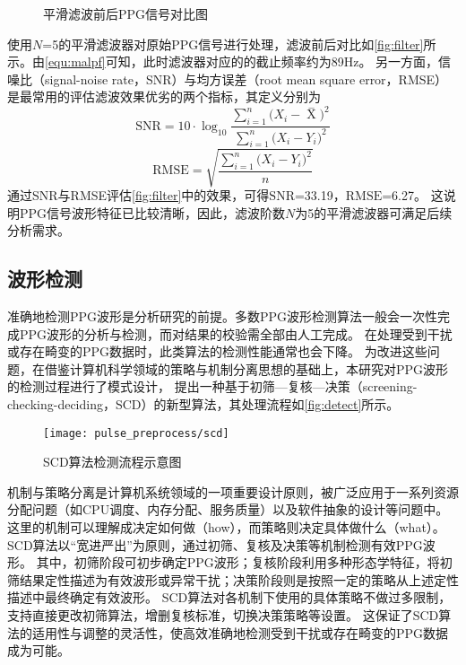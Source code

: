 \begin{figure}[htbp]
    \centering
    \quad
    \caption{\label{fig:filter}平滑滤波前后PPG信号对比图}
\end{figure}

使用$N$=5的平滑滤波器对原始PPG信号进行处理，滤波前后对比如\autoref{fig:filter}所示。由\autoref{equ:malpf}可知，此时滤波器对应的的截止频率约为89Hz。
另一方面，信噪比（signal-noise rate，SNR）与均方误差（root mean square error，RMSE）是最常用的评估滤波效果优劣的两个指标，其定义分别为
\begin{equation}
    \label{equ:snr}
    \text{SNR}=10 \cdot \log_{10}\frac{\sum_{i=1}^{n}{(X_i-\mathop{X} \limits^-})^2}{\sum_{i=1}^{n}{(X_i-Y_i})^2}
\end{equation}
\begin{equation}
    \label{equ:rmse}
    \text{RMSE}=\sqrt{\frac{\sum_{i=1}^{n}{(X_i-Y_i})^2}{n}}
\end{equation}
通过SNR与RMSE评估\autoref{fig:filter}中的效果，可得$\text{SNR}$=33.19，$\text{RMSE}$=6.27。
这说明PPG信号波形特征已比较清晰，因此，滤波阶数$N$为5的平滑滤波器可满足后续分析需求。

\subsection{波形检测}
准确地检测PPG波形是分析研究的前提。多数PPG波形检测算法一般会一次性完成PPG波形的分析与检测，而对结果的校验需全部由人工完成\cite{Zhang2010,Chen2021,Allen2007,Feng2018,FengJiang2018}。
在处理受到干扰或存在畸变的PPG数据时，此类算法的检测性能通常也会下降。
为改进这些问题，在借鉴计算机科学领域的策略与机制分离思想的基础上\cite{Levin1975}，本研究对PPG波形的检测过程进行了模式设计，
提出一种基于初筛—复核—决策（screening-checking-deciding，SCD）的新型算法，其处理流程如\autoref{fig:detect}所示。

\begin{figure}[htbp]
    \centering
    \texttt{[image: pulse\_preprocess/scd]}
    \caption{\label{fig:detect}SCD算法检测流程示意图}
\end{figure}

机制与策略分离是计算机系统领域的一项重要设计原则，被广泛应用于一系列资源分配问题（如CPU调度、内存分配、服务质量）以及软件抽象的设计等问题中\cite{Wulf1974,Levin1975,Brinch2001}。
这里的机制可以理解成决定如何做（how），而策略则决定具体做什么（what）。
SCD算法以“宽进严出”为原则，通过初筛、复核及决策等机制检测有效PPG波形。
其中，初筛阶段可初步确定PPG波形；复核阶段利用多种形态学特征，将初筛结果定性描述为有效波形或异常干扰；决策阶段则是按照一定的策略从上述定性描述中最终确定有效波形。
SCD算法对各机制下使用的具体策略不做过多限制，支持直接更改初筛算法，增删复核标准，切换决策策略等设置。
这保证了SCD算法的适用性与调整的灵活性，使高效准确地检测受到干扰或存在畸变的PPG数据成为可能。

